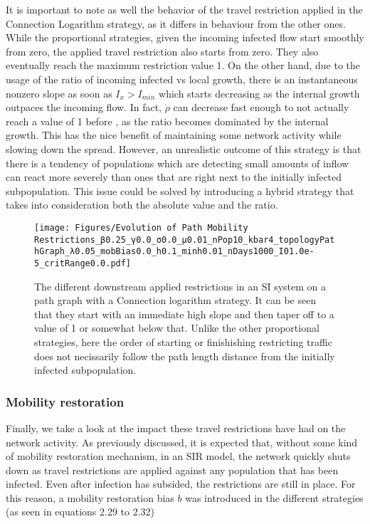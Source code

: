 It is important to note as well the behavior of the travel restriction applied in the Connection Logarithm strategy, as it differs in behaviour from the other ones. While the proportional strategies, given the incoming infected flow start smoothly from zero, the applied travel restriction also starts from zero. They also eventually reach the maximum restriction value 1. On the other hand, due to the usage of the ratio of incoming infected vs local growth, there is an instantaneous nonzero slope as soon as $I_x>I_{min}$ which starts decreasing as the internal growth outpaces the incoming flow. In fact, $\dot \rho$ can decrease fast enough to not actually reach a value of 1 before , as the ratio becomes dominated by the internal growth. This has the nice benefit of maintaining some network activity while slowing down the spread. However, an unrealistic outcome of this strategy is that there is a tendency of populations which are detecting small amounts of inflow can react more severely than ones that are right next to the initially infected subpopulation. This issue could be solved by introducing a hybrid strategy that takes into consideration both the absolute value and the ratio. 

\begin{figure}
    \texttt{[image: Figures/Evolution of Path Mobility Restrictions\_β0.25\_γ0.0\_σ0.0\_μ0.01\_nPop10\_kbar4\_topologyPathGraph\_λ0.05\_mobBias0.0\_h0.1\_minh0.01\_nDays1000\_I01.0e-5\_critRange0.0.pdf]}
    \caption{\small The different downstream applied restrictions in an SI system on a path graph with a Connection logarithm strategy. It can be seen that they start with an immediate high slope and then taper off to a value of 1 or somewhat below that. Unlike the other proportional strategies, here the order of starting or finishishing restricting traffic does not necissarily follow the path length distance from the initially infected subpopulation.}
    \label{fig:log-Restriction}
\end{figure}

\subsubsection{Mobility restoration}

Finally, we take a look at the impact these travel restrictions have had on the network activity. As previously discussed, it is expected that, without some kind of mobility restoration mechanism, in an SIR model, the network quickly shuts down as travel restrictions are applied against any population that has been infected. Even after infection has subsided, the restrictions are still in place. For this reason, a mobility restoration bias $b$ was introduced in the different strategies (as seen in equations 2.29 to 2.32)

